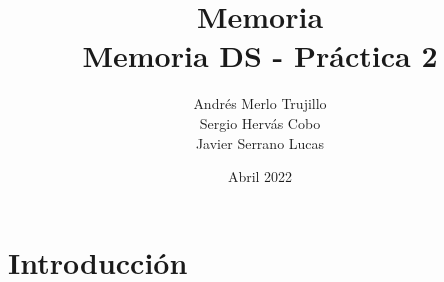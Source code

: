 \documentclass{article}
\title{Memoria\\
\large Memoria DS - Práctica 2}
\author{Andrés Merlo Trujillo\\ Sergio Hervás Cobo\\ Javier Serrano Lucas}
\begin{document}
\date{Abril 2022}
\maketitle
\section{Introducción}
\end{document}

